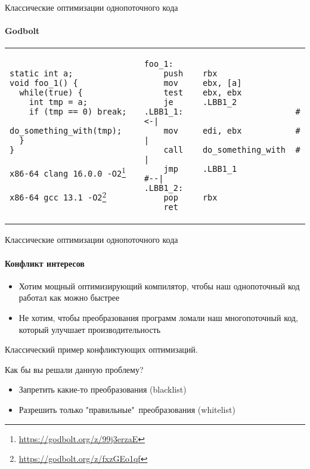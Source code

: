 \begin{frame}{Классические оптимизации однопоточного кода}
\framesubtitle{Godbolt}


\begin{tabular}{p{} p{}}


\begin{verbatim}
static int a;
void foo_1() {
  while(true) {
    int tmp = a;
    if (tmp == 0) break;
    do_something_with(tmp);
  }
}
\end{verbatim}

\texttt{x86-64 clang 16.0.0 -O2}\footnote{\tiny\url{https://godbolt.org/z/99j3erzaE}}

\texttt{x86-64 gcc 13.1 -O2}\footnote{\tiny\url{https://godbolt.org/z/fxzGEo1qf}}

&

\begin{verbatim}
foo_1:                                  
    push    rbx
    mov     ebx, [a]
    test    ebx, ebx
    je      .LBB1_2
.LBB1_1:                       #<-|    
    mov     edi, ebx           #  |
    call    do_something_with  #  |
    jmp     .LBB1_1            #--|
.LBB1_2:
    pop     rbx
    ret
\end{verbatim}

\end{tabular}
\end{frame}


\begin{frame}{Классические оптимизации однопоточного кода}
\framesubtitle{Конфликт интересов}

\begin{itemize}
    \item Хотим мощный оптимизирующий компилятор, чтобы наш однопоточный код работал как можно быстрее
    \item Не хотим, чтобы преобразования программ ломали наш многопоточный код, который улучшает производительность
\end{itemize}

\pause
Классический пример конфликтующих оптимизаций.

\pause
Как бы вы решали данную проблему?

\pause
\begin{itemize}
 \item Запретить какие-то преобразования (blacklist)
 \item Разрешить только "правильные"\ преобразования (whitelist)
\end{itemize}

\end{frame}

